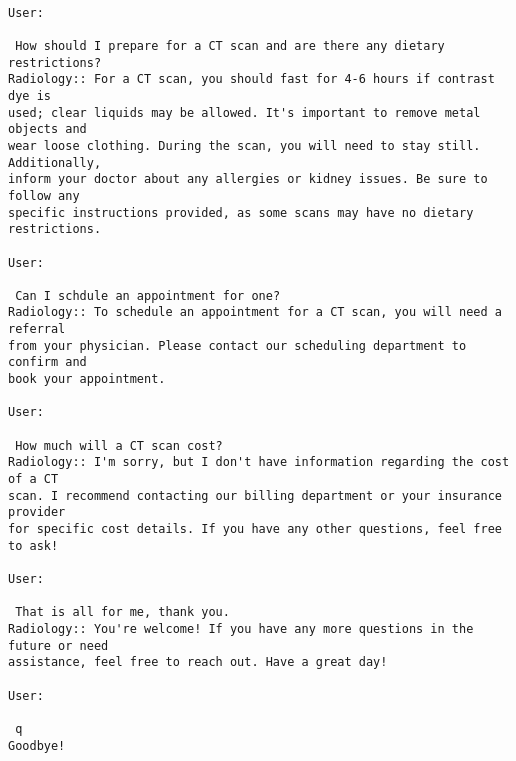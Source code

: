 \documentclass[11pt]{article}
\begin{document}
    \begin{Verbatim}[commandchars=\\\{\}]

User:

 How should I prepare for a CT scan and are there any dietary restrictions?
Radiology:: For a CT scan, you should fast for 4-6 hours if contrast dye is
used; clear liquids may be allowed. It's important to remove metal objects and
wear loose clothing. During the scan, you will need to stay still. Additionally,
inform your doctor about any allergies or kidney issues. Be sure to follow any
specific instructions provided, as some scans may have no dietary restrictions.

User:

 Can I schdule an appointment for one?
Radiology:: To schedule an appointment for a CT scan, you will need a referral
from your physician. Please contact our scheduling department to confirm and
book your appointment.

User:

 How much will a CT scan cost?
Radiology:: I'm sorry, but I don't have information regarding the cost of a CT
scan. I recommend contacting our billing department or your insurance provider
for specific cost details. If you have any other questions, feel free to ask!

User:

 That is all for me, thank you.
Radiology:: You're welcome! If you have any more questions in the future or need
assistance, feel free to reach out. Have a great day!

User:

 q
Goodbye!
    \end{Verbatim}


    
    
    
\end{document}
